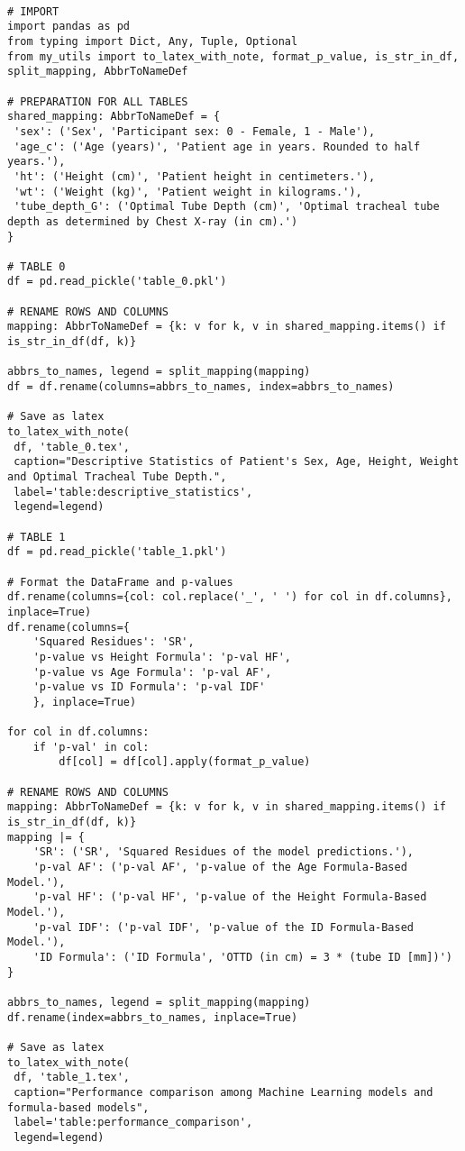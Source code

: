 \documentclass[11pt]{article}
\begin{document}
\begin{verbatim}

# IMPORT
import pandas as pd
from typing import Dict, Any, Tuple, Optional
from my_utils import to_latex_with_note, format_p_value, is_str_in_df, split_mapping, AbbrToNameDef

# PREPARATION FOR ALL TABLES
shared_mapping: AbbrToNameDef = {
 'sex': ('Sex', 'Participant sex: 0 - Female, 1 - Male'),
 'age_c': ('Age (years)', 'Patient age in years. Rounded to half years.'),
 'ht': ('Height (cm)', 'Patient height in centimeters.'),
 'wt': ('Weight (kg)', 'Patient weight in kilograms.'),
 'tube_depth_G': ('Optimal Tube Depth (cm)', 'Optimal tracheal tube depth as determined by Chest X-ray (in cm).')
}

# TABLE 0
df = pd.read_pickle('table_0.pkl')

# RENAME ROWS AND COLUMNS 
mapping: AbbrToNameDef = {k: v for k, v in shared_mapping.items() if is_str_in_df(df, k)} 

abbrs_to_names, legend = split_mapping(mapping)
df = df.rename(columns=abbrs_to_names, index=abbrs_to_names)

# Save as latex
to_latex_with_note(
 df, 'table_0.tex',
 caption="Descriptive Statistics of Patient's Sex, Age, Height, Weight and Optimal Tracheal Tube Depth.", 
 label='table:descriptive_statistics',
 legend=legend)

# TABLE 1
df = pd.read_pickle('table_1.pkl')

# Format the DataFrame and p-values
df.rename(columns={col: col.replace('_', ' ') for col in df.columns}, inplace=True)
df.rename(columns={
    'Squared Residues': 'SR',
    'p-value vs Height Formula': 'p-val HF',
    'p-value vs Age Formula': 'p-val AF',
    'p-value vs ID Formula': 'p-val IDF'
    }, inplace=True)

for col in df.columns:
    if 'p-val' in col:
        df[col] = df[col].apply(format_p_value)

# RENAME ROWS AND COLUMNS 
mapping: AbbrToNameDef = {k: v for k, v in shared_mapping.items() if is_str_in_df(df, k)} 
mapping |= {
    'SR': ('SR', 'Squared Residues of the model predictions.'),
    'p-val AF': ('p-val AF', 'p-value of the Age Formula-Based Model.'),
    'p-val HF': ('p-val HF', 'p-value of the Height Formula-Based Model.'),
    'p-val IDF': ('p-val IDF', 'p-value of the ID Formula-Based Model.'),
    'ID Formula': ('ID Formula', 'OTTD (in cm) = 3 * (tube ID [mm])')
}

abbrs_to_names, legend = split_mapping(mapping)
df.rename(index=abbrs_to_names, inplace=True)

# Save as latex
to_latex_with_note(
 df, 'table_1.tex',
 caption="Performance comparison among Machine Learning models and formula-based models", 
 label='table:performance_comparison',
 legend=legend)


\end{verbatim}
\end{document}
